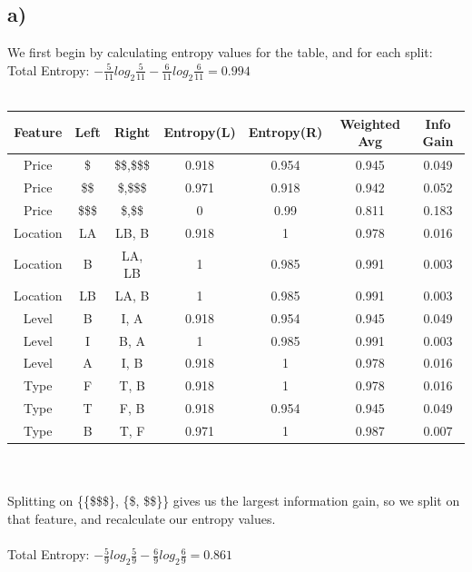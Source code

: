 \documentclass[12pt, letterpaper]{article}
\begin{document}
\subsection*{a)} We first begin by calculating entropy values for the table, and for each split:\\
Total Entropy: $-\frac{5}{11}log_2\frac{5}{11}-\frac{6}{11}log_2\frac{6}{11}=0.994$\\\\
 \begin{tabular}{ |c|c|c|c|c|c|c| } 
 \hline
 \textbf{Feature} & \textbf{Left} & \textbf{Right}& \textbf{Entropy(L)}& \textbf{Entropy(R)}& \textbf{Weighted Avg}& \textbf{Info Gain} \\ 
\hline
Price & \$ & \$\$,\$\$\$ & 0.918 & 0.954 & 0.945 & 0.049 \\ 
\hline
Price & \$\$& \$,\$\$\$ & 0.971 & 0.918 & 0.942 & 0.052 \\ 
\hline
Price & \$\$\$& \$,\$\$ & 0 & 0.99 & 0.811 & 0.183 \\ 
 \hline
Location & LA & LB, B & 0.918 & 1 & 0.978 & 0.016 \\ 
 \hline
Location & B & LA,  LB & 1 & 0.985 & 0.991 & 0.003 \\ 
 \hline
Location & LB & LA, B & 1 & 0.985 & 0.991 & 0.003 \\ 
 \hline
Level & B & I, A & 0.918 & 0.954 & 0.945 & 0.049 \\ 
 \hline
Level & I & B, A & 1 & 0.985 & 0.991 & 0.003 \\ 
 \hline
Level & A & I, B & 0.918 & 1 & 0.978 & 0.016 \\ 
 \hline
Type & F & T, B & 0.918 & 1 & 0.978 & 0.016 \\ 
 \hline
Type & T & F, B & 0.918 & 0.954 & 0.945 & 0.049 \\ 
 \hline
Type & B & T, F & 0.971 & 1 & 0.987 & 0.007 \\ 
 \hline
\end{tabular}\\\\
Splitting on \{\{\$\$\$\}, \{\$, \$\$\}\} gives us the largest information gain, so we split on that feature, and recalculate our entropy values.\\\\
Total Entropy: $-\frac{5}{9}log_2\frac{5}{9}-\frac{6}{9}log_2\frac{6}{9}=0.861$\\\\
\end{document}
